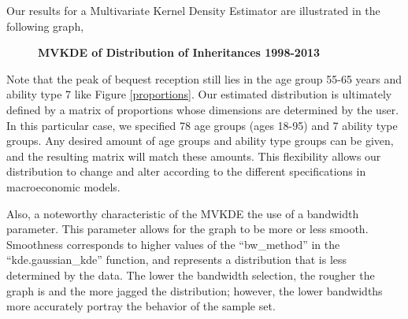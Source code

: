 \documentclass[letterpaper,12pt]{article}
\newcommand{\quotes}[1]{``#1''}
\theoremstyle{definition}
\begin{document}
\begin{spacing}{1.5}
    Our results for a Multivariate Kernel Density Estimator are illustrated in the following graph,\\

    \begin{figure}[htbp]\centering \captionsetup{width=6.0in}
    \caption{\label{MVKDE}\textbf{MVKDE of Distribution of Inheritances 1998-2013}}
  \end{figure}

\newpage
 Note that the peak of bequest reception still lies in the age group 55-65 years and ability type 7 like Figure \ref{proportions}. Our estimated distribution is ultimately defined by a matrix of proportions whose dimensions are determined by the user. In this particular case, we specified 78 age groups (ages 18-95) and 7 ability type groups. Any desired amount of age groups and ability type groups can be given, and the resulting matrix will match these amounts. This flexibility allows our distribution to change and alter according to the different specifications in macroeconomic models.

 Also, a noteworthy characteristic of the MVKDE the use of a bandwidth parameter. This parameter allows for the graph to be more or less smooth. Smoothness corresponds to higher values of the \quotes{bw\_method} in the \quotes{kde.gaussian\_kde} function, and represents a distribution that is less determined by the data. The lower the bandwidth selection, the rougher the graph is and the more jagged the distribution; however, the lower bandwidths more accurately portray the behavior of the sample set. 



\end{spacing}
\end{document}
